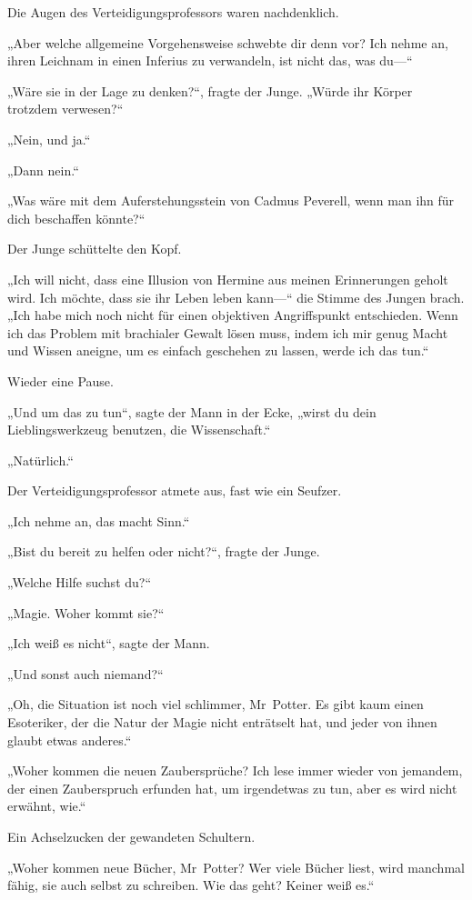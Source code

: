 {Die Augen des Verteidigungsprofessors waren nachdenklich.

„Aber welche allgemeine Vorgehensweise schwebte dir denn vor? Ich nehme an, ihren Leichnam in einen Inferius zu verwandeln, ist nicht das, was du—“

„Wäre sie in der Lage zu denken?“, fragte der Junge. „Würde ihr Körper trotzdem verwesen?“

„Nein, und ja.“

„Dann nein.“

„Was wäre mit dem Auferstehungsstein von Cadmus Peverell, wenn man ihn für dich beschaffen könnte?“

Der Junge schüttelte den Kopf.

„Ich will nicht, dass eine Illusion von Hermine aus meinen Erinnerungen geholt wird. Ich möchte, dass sie ihr Leben leben kann—“ die Stimme des Jungen brach. „Ich habe mich noch nicht für einen objektiven Angriffspunkt entschieden. Wenn ich das Problem mit brachialer Gewalt lösen muss, indem ich mir genug Macht und Wissen aneigne, um es einfach geschehen zu lassen, werde ich das tun.“

Wieder eine Pause.

„Und um das zu tun“, sagte der Mann in der Ecke, „wirst du dein Lieblingswerkzeug benutzen, die Wissenschaft.“

„Natürlich.“

Der Verteidigungsprofessor atmete aus, fast wie ein Seufzer.

„Ich nehme an, das macht Sinn.“

„Bist du bereit zu helfen oder nicht?“, fragte der Junge.

„Welche Hilfe suchst du?“

„Magie. Woher kommt sie?“

„Ich weiß es nicht“, sagte der Mann.

„Und sonst auch niemand?“

„Oh, die Situation ist noch viel schlimmer, Mr~Potter. Es gibt kaum einen Esoteriker, der die Natur der Magie nicht enträtselt hat, und jeder von ihnen glaubt etwas anderes.“

„Woher kommen die neuen Zaubersprüche? Ich lese immer wieder von jemandem, der einen Zauberspruch erfunden hat, um irgendetwas zu tun, aber es wird nicht erwähnt, wie.“

Ein Achselzucken der gewandeten Schultern.

„Woher kommen neue Bücher, Mr~Potter? Wer viele Bücher liest, wird manchmal fähig, sie auch selbst zu schreiben. Wie das geht? Keiner weiß es.“

}
